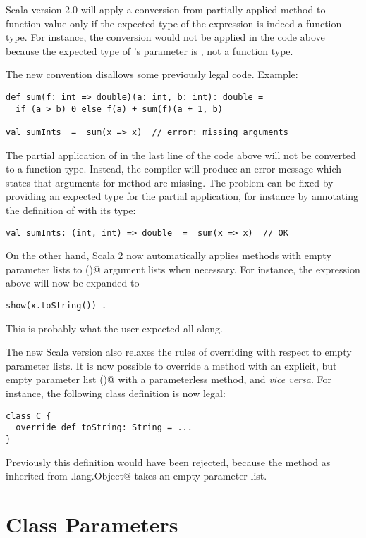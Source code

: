 \documentclass[a4paper,11pt,twoside]{article}
\begin{document}
Scala version 2.0 will apply a conversion from partially applied
method to function value only if the expected type of the expression
is indeed a function type. For instance, the conversion would not be
applied in the code above because the expected type of
\lstinline@show@'s parameter is \lstinline@String@, not a function
type. 

The new convention disallows some previously legal code. Example:
\begin{lstlisting}
def sum(f: int => double)(a: int, b: int): double =
  if (a > b) 0 else f(a) + sum(f)(a + 1, b)

val sumInts  =  sum(x => x)  // error: missing arguments
\end{lstlisting}
The partial application of \lstinline@sum@ in the last line of
the code above will not be converted to a function type. Instead, the
compiler will produce an error message which states that arguments for method
\lstinline@sum@ are missing. The problem can be fixed by providing an
expected type for the partial application, for instance by annotating
the definition of \lstinline@sumInts@ with its type:
\begin{lstlisting}
val sumInts: (int, int) => double  =  sum(x => x)  // OK
\end{lstlisting}

On the other hand, Scala 2 now automatically applies methods
with empty parameter lists to \lstinline@()@ argument lists when
necessary. For instance, the \lstinline@show@ expression above will
now be expanded to
\begin{lstlisting}
show(x.toString()) .
\end{lstlisting}
This is probably what the user expected all along.

The new Scala version also relaxes the rules of overriding with
respect to empty parameter lists. It is now possible to override a
method with an explicit, but empty parameter list \lstinline@()@ with
a parameterless method, and {\em vice versa}. For instance, 
the following class definition is now legal:
\begin{lstlisting}
class C {
  override def toString: String = ...
}
\end{lstlisting}
Previously this definition would have been rejected, because the
\lstinline@toString@ method as inherited from
\lstinline@java.lang.Object@ takes an empty parameter list.  

\section{Class Parameters}\label{classparams}
\end{document}
